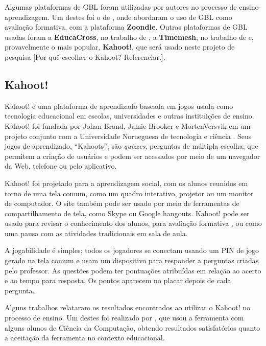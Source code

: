Algumas plataformas de GBL foram utilizadas por autores no processo de ensino-aprendizagem. Um destes foi o de , onde abordaram o uso de GBL como avaliação formativa, com a plataforma \textbf{Zoondle}. Outras plataformas de GBL usadas foram a \textbf{EducaCross}, no trabalho de , a \textbf{Timemesh}, no trabalho de  e, provavelmente o mais popular, \textbf{Kahoot!}, que será usado neste projeto de pesquisa {\color{red}[Por quê escolher o Kahoot? Referenciar.]}.

\subsection{Kahoot!} \label{sec:Kahoot!}
Kahoot! é uma plataforma de aprendizado baseada em jogos usada como tecnologia educacional em escolas, universidades e outras instituições de ensino. Kahoot! foi fundada por Johan Brand, Jamie Brooker e MortenVersvik em um projeto conjunto com a Universidade Norueguesa de tecnologia e ciência \cite{kahoot2018}. Seus jogos de aprendizado, ``Kahoots'', são \textit{quizzes}, perguntas de múltipla escolha, que permitem a criação de usuários e podem ser acessados por meio de um navegador da Web, telefone ou pelo aplicativo.

Kahoot! foi projetado para a aprendizagem social, com os alunos reunidos em torno de uma tela comum, como um quadro interativo, projetor ou um monitor de computador. O site também pode ser usado por meio de ferramentas de compartilhamento de tela, como Skype ou Google hangouts. Kahoot! pode ser usado para revisar o conhecimento dos alunos, para avaliação formativa \cite{kahootFormative}, ou como uma pausa com as atividades tradicionais em sala de aula. 

A jogabilidade é simples; todos os jogadores se conectam usando um PIN de jogo gerado na tela comum e usam um dispositivo para responder a perguntas criadas pelo professor. As questões podem ter pontuações atribuídas em relação ao acerto e ao tempo para resposta. Os pontos aparecem no placar depois de cada pergunta.

Alguns trabalhos relataram os resultados encontrados ao utilizar o Kahoot! no processo de ensino. Um destes foi realizado por , que usou a ferramenta com alguns alunos de Ciência da Computação, obtendo resultados satisfatórios quanto a aceitação da ferramenta no contexto educacional.

 
